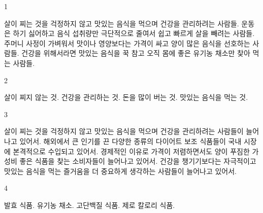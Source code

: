 \documentclass[fs9,seriesFre]{korfarm-base}
\begin{document}
\kfActivityBg \par{}
\par{}\par\nopagebreak[4]\smallskip\nopagebreak[4]
\kfBeginMC
\begin{kfSentenceUnit}{1}{}
\begin{kfChoices}
\kfChoice 살이 찌는 것을 걱정하지 않고 맛있는 음식을 먹으며 건강을 관리하려는 사람들.
\kfChoice 운동은 하기 싫어하고 음식 섭취량만 극단적으로 줄여서 쉽고 빠르게 살을 빼려는 사람들.
\kfChoice 주머니 사정이 가벼워서 맛이나 영양보다는 가격이 싸고 양이 많은 음식을 선호하는 사람들.
\kfChoice 건강을 위해서라면 맛있는 음식을 꾹 참고 오직 몸에 좋은 유기농 채소만 찾아 먹는 사람들.
\end{kfChoices}
\end{kfSentenceUnit}

\begin{kfSentenceUnit}{2}{}
\begin{kfChoices}
\kfChoice 살이 찌지 않는 것.
\kfChoice 건강을 관리하는 것.
\kfChoice 돈을 많이 버는 것.
\kfChoice 맛있는 음식을 먹는 것.
\end{kfChoices}
\end{kfSentenceUnit}

\begin{kfSentenceUnit}{3}{}
\begin{kfChoices}
\kfChoice 살이 찌는 것을 걱정하지 않고 맛있는 음식을 먹으며 건강을 관리하려는 사람들이 늘어나고 있어서.
\kfChoice 해외에서 큰 인기를 끈 다양한 종류의 다이어트 보조 식품들이 국내 시장에 본격적으로 수입되고 있어서.
\kfChoice 경제적인 이유로 가격이 저렴하면서도 양이 푸짐한 가성비 좋은 식품을 찾는 소비자들이 늘어나고 있어서.
\kfChoice 건강을 챙기기보다는 자극적이고 맛있는 음식을 먹는 즐거움을 더 중요하게 생각하는 사람들이 늘어나고 있어서.
\end{kfChoices}
\end{kfSentenceUnit}

\begin{kfSentenceUnit}{4}{}
\begin{kfChoices}
\kfChoice 발효 식품.
\kfChoice 유기농 채소.
\kfChoice 고단백질 식품.
\kfChoice 제로 칼로리 식품.
\end{kfChoices}
\end{kfSentenceUnit}
\end{document}
